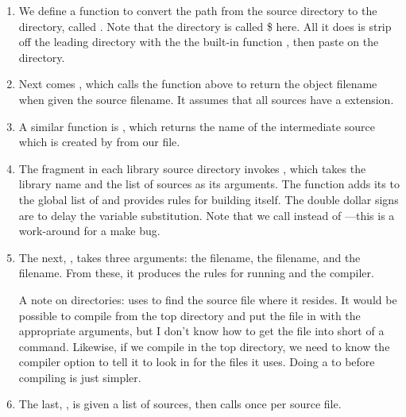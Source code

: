 \begin{enumerate}

\item We define a function to convert the path from
the source directory to the  directory, called
. Note that the  directory
is called \$ here. All it does is strip off the
leading directory with the the built-in function , then
paste on the  directory.

\item Next comes , which calls the function above to
return the object filename when given the source filename. It assumes
that all sources have a  extension.

\item A similar function is , which returns the name of the
intermediate source which is created by  from our
 file.

\item The  fragment in each library source directory invokes
, which takes the library name and the list of sources
as its arguments. The function adds its  to the global list
of  and provides rules for building itself. The double
dollar signs are to delay the variable substitution. Note that we call
 instead of ---this
is a work-around for a make bug.

\item The next, , takes three arguments: the 
filename, the  filename, and the  filename. From
these, it produces the  rules for running  and the
compiler.

A note on directories:  uses  to find the
source file where it resides. It would be possible to compile from
the top directory and put the  file in  with the
appropriate arguments, but I don't know how to get the  file
into  short of a  command. Likewise, if we compile
in the top directory, we need to know the compiler option to tell it to
look in  for the  files it uses. Doing a 
to  before compiling is just simpler.

\item The last, , is given a list of sources, then calls
 once per source file.
\end{enumerate}

